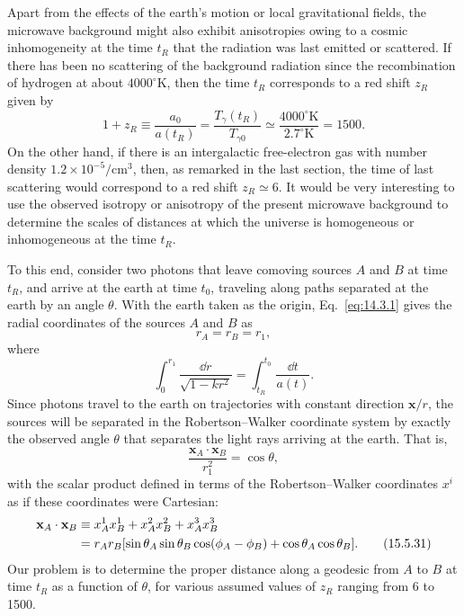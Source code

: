 Apart from the effects of the earth's motion or local gravitational fields,
the microwave background might also exhibit anisotropies owing to a cosmic
inhomogeneity at the time \(t_R\) that the radiation was last emitted or
scattered. If there has been no scattering of the background radiation since
the recombination of hydrogen at about \(4000^\circ\mathrm{K}\), then the time
\(t_R\) corresponds to a red shift \(z_R\) given by
\[
  1+z_R
  \equiv
  \frac{a_0}{a(t_R)}
  =
  \frac{T_\gamma(t_R)}{T_{\gamma0}}
  \simeq
  \frac{4000^\circ\mathrm{K}}{2.7^\circ\mathrm{K}}
  =
  1500.
\]
On the other hand, if there is an intergalactic free-electron gas with number
density \(1.2\times10^{-5}/\mathrm{cm^3}\), then, as remarked in the last
section, the time of last scattering would correspond to a red shift
\(z_R\simeq6\). It would be very interesting to use the observed isotropy or
anisotropy of the present microwave background to determine the scales of
distances at which the universe is homogeneous or inhomogeneous at the time
\(t_R\).

To this end, consider two photons that leave comoving sources \(A\) and \(B\)
at time \(t_R\), and arrive at the earth at time \(t_0\), traveling along
paths separated at the earth by an angle \(\theta\). With the earth taken as
the origin, Eq.~\eqref{eq:14.3.1} gives the radial coordinates of the sources
\(A\) and \(B\) as
\begin{equation}
  r_A=r_B=r_1,
  \tag{15.5.28}\label{eq:15.5.28}
\end{equation}
where
\begin{equation}
  \int_0^{r_1}\frac{\dd r}{\sqrt{1-kr^2}}
  =
  \int_{t_R}^{t_0}\frac{\dd t}{a(t)}.
  \tag{15.5.29}\label{eq:15.5.29}
\end{equation}
Since photons travel to the earth on trajectories with constant direction
\(\mathbf x/r\), the sources will be separated in the Robertson--Walker
coordinate system by exactly the observed angle \(\theta\) that separates the
light rays arriving at the earth. That is,
\begin{equation}
  \frac{\mathbf x_A\cdot\mathbf x_B}{r_1^2}=\cos\theta,
  \tag{15.5.30}\label{eq:15.5.30}
\end{equation}
with the scalar product defined in terms of the Robertson--Walker coordinates
\(x^i\) as if these coordinates were Cartesian:
\begin{align}
  \mathbf x_A\cdot\mathbf x_B
  &\equiv
  x_A^1x_B^1+x_A^2x_B^2+x_A^3x_B^3
  \notag\\
  &=
  r_Ar_B
  [\sin\theta_A\sin\theta_B\cos(\phi_A-\phi_B)
  +\cos\theta_A\cos\theta_B].
  \tag{15.5.31}\label{eq:15.5.31}
\end{align}
Our problem is to determine the proper distance along a geodesic from \(A\)
to \(B\) at time \(t_R\) as a function of \(\theta\), for various assumed
values of \(z_R\) ranging from 6 to 1500.

